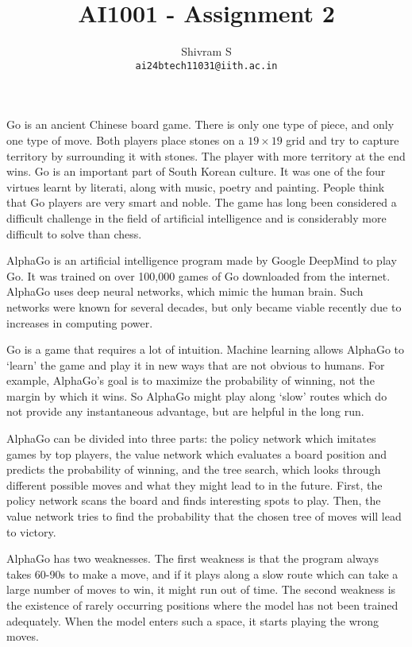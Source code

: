 \documentclass{article}
\title{AI1001 - Assignment 2}
\author{Shivram S \\ \texttt{ai24btech11031@iith.ac.in}}
\begin{document}
\maketitle

Go is an ancient Chinese board game. There is only one type of piece, and only one
type of move. Both players place stones on a $19 \times 19$ grid and try to capture
territory by surrounding it with stones. The player with more territory at the end
wins. Go is an important part of South Korean culture. It was one of the four virtues
learnt by literati, along with music, poetry and painting. People think that Go
players are very smart and noble. The game has long been considered a difficult
challenge in the field of artificial intelligence and is considerably more difficult
 to solve than chess.

AlphaGo is an artificial intelligence program made by Google DeepMind to play Go.
It was trained on over 100,000 games of Go
downloaded from the internet. AlphaGo uses deep neural networks, which mimic the
human brain. Such networks were known for several decades, but only became viable
recently due to increases in computing power.

Go is a game that requires a lot of intuition. Machine learning allows AlphaGo to
`learn' the game and play it in new ways that are not obvious to humans. For example,
AlphaGo's goal is to maximize the probability of winning, not the margin by which it
wins. So AlphaGo might play along `slow' routes which do not provide any instantaneous
advantage, but are helpful in the long run.

AlphaGo can be divided into three parts: the policy network which imitates games by
top players, the value network which evaluates a board position and predicts the
probability of winning, and the tree search, which looks through different possible
moves and what they might lead to in the future. First, the policy network scans the
board and finds interesting spots to play. Then, the value network tries to find
the probability that the chosen tree of moves will lead to victory.

AlphaGo has two weaknesses. The first weakness is that the program always takes 60-90s
to make a move, and if it plays along a slow route which can take a large number of
moves to win, it might run out of time. The second weakness is the existence of rarely
occurring positions where the model has not been trained adequately. When the model
enters such a space, it starts playing the wrong moves. 
\end{document}

